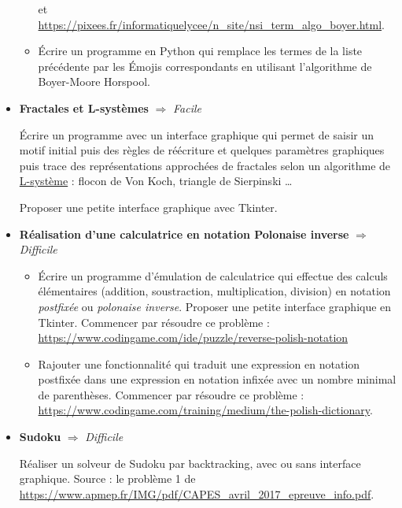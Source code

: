 \documentclass[a4paper, french, 12pt]{article}  %
\newcounter{act}
\newcounter{thme}
\newcounter{alg}
\begin{document}
\begin{itemize}
\begin{itemize}
et \url{https://pixees.fr/informatiquelycee/n_site/nsi_term_algo_boyer.html}.
   \item  Écrire un programme en Python qui remplace les termes de la liste précédente par les Émojis correspondants en utilisant l'algorithme de Boyer-Moore Horspool.
  \end{itemize}



\bigskip

\item \textbf{Fractales et L-systèmes} $\Rightarrow$ \textit{Facile}

Écrire un programme avec un interface graphique qui permet de saisir un motif initial puis des règles de réécriture et quelques paramètres graphiques puis  trace des représentations approchées de fractales selon un algorithme de \href{https://fr.wikipedia.org/wiki/L-Syst\%C3\%A8me}{L-système} : flocon de Von Koch, triangle de Sierpinski \ldots 

Proposer une petite interface graphique avec Tkinter.

\bigskip

\item \textbf{Réalisation d'une calculatrice en notation Polonaise inverse} $\Rightarrow$ \textit{Difficile}

\medskip

\begin{itemize}

 \item Écrire un programme d'émulation de calculatrice qui effectue des calculs  élémentaires (addition, soustraction, multiplication, division) en notation \textit{postfixée} ou \textit{ polonaise inverse}. Proposer une petite interface graphique en Tkinter. Commencer par résoudre ce problème : \url{https://www.codingame.com/ide/puzzle/reverse-polish-notation}
 
 \item Rajouter une fonctionnalité qui traduit une expression en notation postfixée dans une  expression en notation infixée avec  un nombre minimal de parenthèses. Commencer par résoudre ce problème : \url{https://www.codingame.com/training/medium/the-polish-dictionary}.
 
 \end{itemize}

 \bigskip
 
 
\item \textbf{Sudoku} $\Rightarrow$ \textit{Difficile}
 
\medskip

Réaliser un solveur de Sudoku  par backtracking, avec ou sans interface graphique.  Source : le problème 1 de \url{https://www.apmep.fr/IMG/pdf/CAPES_avril_2017_epreuve_info.pdf}. 



\end{itemize}
\end{document}
